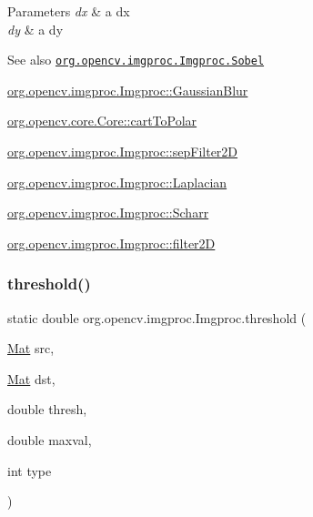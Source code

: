 \begin{DoxyParams}{Parameters}
{\em dx} & a dx \\
\hline
{\em dy} & a dy\\
\hline
\end{DoxyParams}
\begin{DoxySeeAlso}{See also}
\href{http://docs.opencv.org/modules/imgproc/doc/filtering.html#sobel}{\tt org.\+opencv.\+imgproc.\+Imgproc.\+Sobel} 

\mbox{\hyperlink{classorg_1_1opencv_1_1imgproc_1_1_imgproc_a1f720ad6bef4616a3268c98abd811350}{org.\+opencv.\+imgproc.\+Imgproc\+::\+Gaussian\+Blur}} 

\mbox{\hyperlink{classorg_1_1opencv_1_1core_1_1_core_a395a53b9bd769978c12c2c19a02ffeae}{org.\+opencv.\+core.\+Core\+::cart\+To\+Polar}} 

\mbox{\hyperlink{classorg_1_1opencv_1_1imgproc_1_1_imgproc_a7c78cbc2fc093f0008a749cfa15c3a81}{org.\+opencv.\+imgproc.\+Imgproc\+::sep\+Filter2D}} 

\mbox{\hyperlink{classorg_1_1opencv_1_1imgproc_1_1_imgproc_add62d4b55bc4e7cc4faca4a77f6d3f94}{org.\+opencv.\+imgproc.\+Imgproc\+::\+Laplacian}} 

\mbox{\hyperlink{classorg_1_1opencv_1_1imgproc_1_1_imgproc_a94c9e2fdd65ecd76ae9135e33cfb9a99}{org.\+opencv.\+imgproc.\+Imgproc\+::\+Scharr}} 

\mbox{\hyperlink{classorg_1_1opencv_1_1imgproc_1_1_imgproc_af8d713c4327b7458705f063ad4fa83e5}{org.\+opencv.\+imgproc.\+Imgproc\+::filter2D}} 
\end{DoxySeeAlso}
\mbox{\label{classorg_1_1opencv_1_1imgproc_1_1_imgproc_a428d1896f05ae5e0eadbe9a1489e6368}} 
\subsubsection{\texorpdfstring{threshold()}{threshold()}}
{\footnotesize\ttfamily static double org.\+opencv.\+imgproc.\+Imgproc.\+threshold (\begin{DoxyParamCaption}\item[{\mbox{\hyperlink{classorg_1_1opencv_1_1core_1_1_mat}{Mat}}}]{src,  }\item[{\mbox{\hyperlink{classorg_1_1opencv_1_1core_1_1_mat}{Mat}}}]{dst,  }\item[{double}]{thresh,  }\item[{double}]{maxval,  }\item[{int}]{type }\end{DoxyParamCaption})\hspace{0.3cm}{\ttfamily [static]}}

